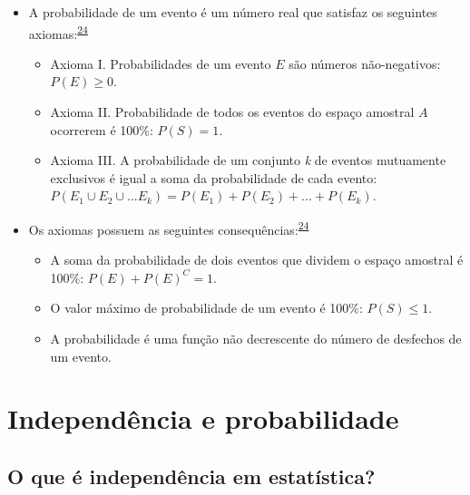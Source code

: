 \documentclass[
  a4paper,
]{book}
\begin{document}
\begin{itemize}
\item
  A probabilidade de um evento é um número real que satisfaz os seguintes axiomas:\textsuperscript{\protect\hyperlink{ref-grami2023}{24}}

  \begin{itemize}
  \item
    Axioma I. Probabilidades de um evento \(E\) são números não-negativos: \(P(E)≥0\).
  \item
    Axioma II. Probabilidade de todos os eventos do espaço amostral \(A\) ocorrerem é 100\%: \(P(S)=1\).
  \item
    Axioma III. A probabilidade de um conjunto \emph{k} de eventos mutuamente exclusivos é igual a soma da probabilidade de cada evento: \(P(E_{1} \cup E_{2} \cup ... E_{k}) = P(E_{1}) + P(E_{2}) + ... + P(E_{k})\).
  \end{itemize}
\item
  Os axiomas possuem as seguintes consequências:\textsuperscript{\protect\hyperlink{ref-grami2023}{24}}

  \begin{itemize}
  \item
    A soma da probabilidade de dois eventos que dividem o espaço amostral é 100\%: \(P(E)+P(E)^C=1\).
  \item
    O valor máximo de probabilidade de um evento é 100\%: \(P(S)≤1\).
  \item
    A probabilidade é uma função não decrescente do número de desfechos de um evento.
  \end{itemize}
\end{itemize}

\hypertarget{independencia-probabilidade}{%
\section{Independência e probabilidade}\label{independencia-probabilidade}}

\hypertarget{o-que-uxe9-independuxeancia-em-estatuxedstica}{%
\subsection{O que é independência em estatística?}\label{o-que-uxe9-independuxeancia-em-estatuxedstica}}
\end{document}
